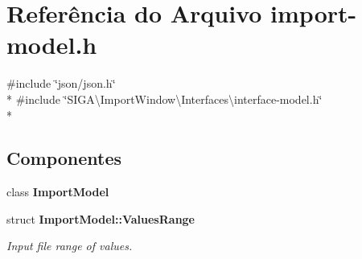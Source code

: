 \section{Referência do Arquivo import-\/model.h}
\label{import-model_8h}
{\ttfamily \#include \char`\"{}json/json.\+h\char`\"{}}\\*
{\ttfamily \#include \char`\"{}S\+I\+G\+A\textbackslash{}\+Import\+Window\textbackslash{}\+Interfaces\textbackslash{}interface-\/model.\+h\char`\"{}}\\*
\subsection*{Componentes}
\begin{DoxyCompactItemize}
\item 
class {\bf Import\+Model}
\item 
struct {\bf Import\+Model\+::\+Values\+Range}
\begin{DoxyCompactList}\small\item\em Input file range of values. \end{DoxyCompactList}\end{DoxyCompactItemize}

